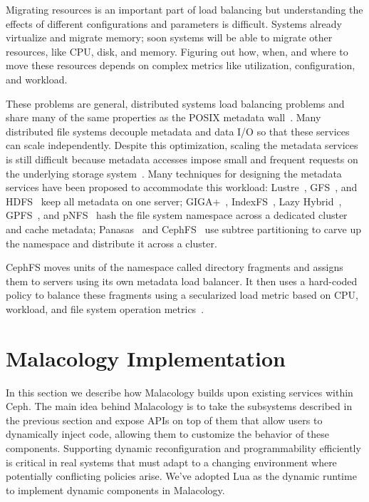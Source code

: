 \documentclass[10pt,twocolumn]{article}
\begin{document}
Migrating resources is an important part of load balancing but understanding the effects of different configurations and parameters is difficult. Systems already virtualize and migrate memory; soon systems will be able to migrate other resources, like CPU, disk, and memory. Figuring out how, when, and where to move these resources depends on complex metrics like utilization, configuration, and workload.

These problems are general, distributed systems load balancing problems and share many of the same properties as the POSIX metadata wall~\cite{alam:pdsw2011-metadata-scaling,ghemawat:sosp2003-gfs,hildebrand:msst2005-pnfs,weil_ceph_2006,welch:fast2008-panasas,shvachko:login2012-hdfs-scalability}. Many distributed file systems decouple metadata and data I/O so that
these services can scale independently. Despite
this optimization, scaling the metadata services is still difficult
because metadata accesses impose small and frequent requests on the
underlying storage system~\cite{roselli:atec2000-FS-workloads}. Many
techniques for designing the metadata services have been proposed to
accommodate this workload: Lustre~\cite{konstantinos:pdsw2014-lustre-metadata}, GFS~\cite{ghemawat:sosp2003-gfs}, and HDFS~\cite{shvachko:login2012-hdfs-scalability} keep all metadata on one
server; GIGA+~\cite{patil:fast2011-giga}, IndexFS~\cite{ren:sc2014-indexfs}, Lazy Hybrid~\cite{brandt:msst2003-lh}, GPFS~\cite{schmuck:fast2002-gpfs},
and pNFS~\cite{hildebrand:supercomputing2006-pNFS} hash the file
system namespace across a dedicated cluster and cache metadata; Panasas~\cite{welch:fast2008-panasas} and CephFS~\cite{weil:sc2004-dyn-metadata} use subtree partitioning to carve up the namespace and distribute it across a cluster.

CephFS moves units of the namespace called directory fragments and assigns them to servers using  its own metadata load balancer. It then uses a hard-coded policy to balance these fragments using a secularized load metric based on CPU, workload, and file system operation metrics~\cite{sevilla:sc15-mantle}.

\section{Malacology Implementation}
\label{implementation}

In this section we describe how Malacology builds upon existing
services within Ceph. The main idea behind Malacology is to take the subsystems 
described in the previous section and expose APIs on top of them that allow 
users to dynamically inject code, allowing them to customize the behavior of 
these components. Supporting dynamic reconfiguration and programmability 
efficiently is critical in real systems that must adapt to a changing 
environment where potentially
conflicting policies arise. We've adopted Lua as the dynamic runtime  to
implement dynamic components in Malacology.
\end{document}
